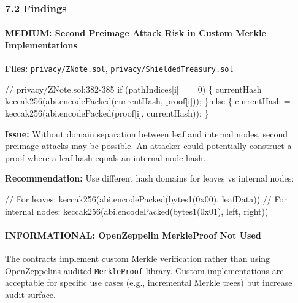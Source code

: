 \documentclass[
]{article}
\newenvironment{Shaded}{}{}
\newcommand{\NormalTok}[1]{#1}
\begin{document}
\subsubsection{7.2 Findings}\label{72-findings}

\paragraph{MEDIUM: Second Preimage Attack Risk in Custom Merkle
Implementations}\label{medium-second-preimage-attack-risk-in-custom-merkle-implementations}

\textbf{Files:} \texttt{privacy/ZNote.sol},
\texttt{privacy/ShieldedTreasury.sol}

\begin{Shaded}
\begin{Highlighting}[]
\NormalTok{// privacy/ZNote.sol:382{-}385}
\NormalTok{if (pathIndices[i] == 0) \{}
\NormalTok{    currentHash = keccak256(abi.encodePacked(currentHash, proof[i]));}
\NormalTok{\} else \{}
\NormalTok{    currentHash = keccak256(abi.encodePacked(proof[i], currentHash));}
\NormalTok{\}}
\end{Highlighting}
\end{Shaded}

\textbf{Issue:} Without domain separation between leaf and internal
nodes, second preimage attacks may be possible. An attacker could
potentially construct a proof where a leaf hash equals an internal node
hash.

\textbf{Recommendation:} Use different hash domains for leaves vs
internal nodes:

\begin{Shaded}
\begin{Highlighting}[]
\NormalTok{// For leaves:}
\NormalTok{keccak256(abi.encodePacked(bytes1(0x00), leafData))}
\NormalTok{// For internal nodes:}
\NormalTok{keccak256(abi.encodePacked(bytes1(0x01), left, right))}
\end{Highlighting}
\end{Shaded}

\paragraph{INFORMATIONAL: OpenZeppelin MerkleProof Not
Used}\label{informational-openzeppelin-merkleproof-not-used}

The contracts implement custom Merkle verification rather than using
OpenZeppelin\textquotesingle s audited \texttt{MerkleProof} library.
Custom implementations are acceptable for specific use cases (e.g.,
incremental Merkle trees) but increase audit surface.
\end{document}
